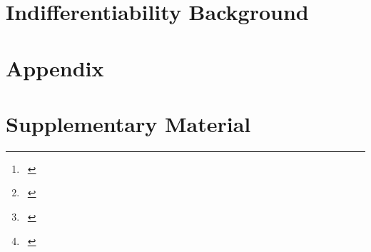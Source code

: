 \documentclass[envcountsame]{llncs}
\title{\titletext}
\author{}
\institute{}
\author{
			\Davis\inst{1} \and
			\Diemert\inst{2} \and
			\Guenther\inst{3} \and
			\Jager\inst{2}
		}
\institute{%
			\DavisCompany,
			\DavisAddress\\
			\email{\DavisEmail}
			\and
			\DiemertCompany,
			\DiemertAddress\\
			\email{\DiemertEmail},
			\email{\JagerEmail}
			\and
			\GuentherCompany,
			\GuentherAddress\\
			\email{\GuentherEmail}
		}
\author{%
			\textsc{\Davis}\thanks{~\DavisThanks} \and
			\textsc{\Diemert}\thanks{~\DiemertThanks} \and
			\textsc{\Guenther}\thanks{~\GuentherThanks} \and
			\textsc{\Jager}\thanks{~\JagerThanks}
		}
\begin{document}

 \ifdraft
%
 \fi



% 



\iffull
	\section{Indifferentiability Background}
	\label{app:indiff-background}

	
\fi








%  


\iffull

\else
% 

\fi



\ifproceedings
\else
	\newpage

	\appendix

	\iffull
	 \section*{Appendix}
	\else
	\section*{Supplementary Material}
	\fi

	\iffull
	\else
	
	\fi

	\iffull
	\else
		
	\fi

	\iffull
	\else
		
	\fi
	

	\iffull
	\else
	
	
	\fi

	

	\iffull
	\else
		
	\fi 
\fi %
\end{document}
